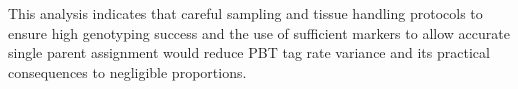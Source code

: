 \documentclass[11pt]{article}
\begin{document}
This analysis indicates that careful sampling and tissue handling protocols to ensure high genotyping success and the use of sufficient markers to allow
accurate single parent assignment would reduce PBT tag rate variance and its practical consequences to negligible proportions.



 
\end{document}
